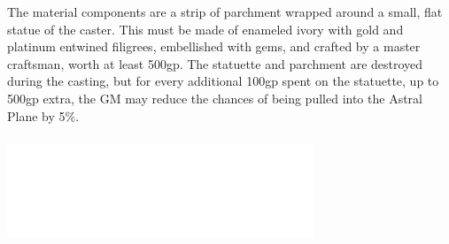 \begin{multicols}{2}
The material components are a strip of parchment wrapped around a small, flat statue of the caster.  This must be made of enameled ivory with gold and platinum entwined filigrees, embellished with gems, and crafted by a master craftsman, worth at least 500gp.  The statuette and parchment are destroyed during the casting, but for every additional 100gp spent on the statuette, up to 500gp extra, the GM may reduce the chances of being pulled into the Astral Plane by 5\%.

\noindent\includegraphics[width=3.6in, height=1.25in]{testblock.pdf}

\end{multicols}

